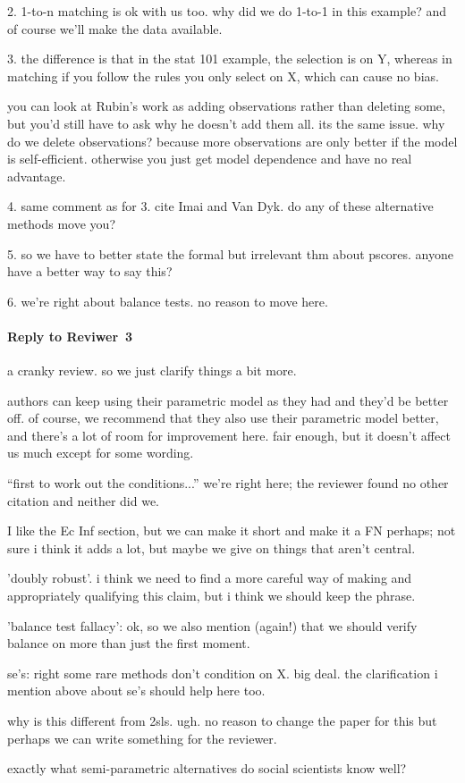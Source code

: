 \documentclass[11pt]{article}
\begin{document}
2. 1-to-n matching is ok with us too.  why did we do 1-to-1 in this
example?  and of course we'll make the data available.

3.  the difference is that in the stat 101 example, the selection is
on Y, whereas in matching if you follow the rules you only select on
X, which can cause no bias.

you can look at Rubin's work as adding observations rather than
deleting some, but you'd still have to ask why he doesn't add them
all.  its the same issue.  why do we delete observations?  because
more observations are only better if the model is self-efficient.
otherwise you just get model dependence and have no real advantage.

4.  same comment as for 3.  cite Imai and Van Dyk.  do any of these
alternative methods move you?

5. so we have to better state the formal but irrelevant thm about
pscores.  anyone have a better way to say this?

6.  we're right about balance tests.  no reason to move here.

\paragraph{Reply to Reviwer~3}

a cranky review.  so we just clarify things a bit more.

authors can keep using their parametric model as they had and they'd
be better off.  of course, we recommend that they also use their
parametric model better, and there's a lot of room for improvement
here.  fair enough, but it doesn't affect us much except for some
wording.

``first to work out the conditions...''  we're right here; the
reviewer found no other citation and neither did we.

I like the Ec Inf section, but we can make it short and make it a FN
perhaps; not sure i think it adds a lot, but maybe we give on things
that aren't central.

'doubly robust'.  i think we need to find a more careful way of making
and appropriately qualifying this claim, but i think we should keep
the phrase.
 
'balance test fallacy':  ok, so we also mention (again!) that we
should verify balance on more than just the first moment.

se's:  right some rare methods don't condition on X.  big deal.  the
clarification i mention above about se's should help here too.

why is this different from 2sls.  ugh.  no reason to change the paper
for this but perhaps we can write something for the reviewer.

exactly what semi-parametric alternatives do social scientists know
well?  
\end{document}
